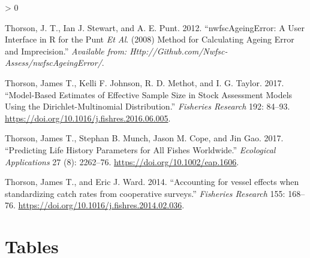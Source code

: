 \documentclass[11pt,
  english,
  a4paper,
]{article}
\newlength{\cslhangindent}
\newenvironment{CSLReferences}[2] %
 {%
  \setlength{\parindent}{0pt}
  \ifodd #1 \everypar{\setlength{\hangindent}{\cslhangindent}}\ignorespaces\fi
  \ifnum #2 > 0
  \setlength{\parskip}{#2\baselineskip}
  \fi
 }%
 {}
\begin{document}
\begin{CSLReferences}{1}{0}
\leavevmode\hypertarget{ref-thorson_nwfscageingerror:_2012}{}%
Thorson, J. T., Ian J. Stewart, and A. E. Punt. 2012. {``{nwfscAgeingError}: A User Interface in {R} for the {P}unt \emph{Et Al}. (2008) Method for Calculating Ageing Error and Imprecision.''} \emph{Available from: Http://Github.com/Nwfsc-Assess/nwfscAgeingError/}.

\leavevmode\hypertarget{ref-thorson_model-based_2017}{}%
Thorson, James T., Kelli F. Johnson, R. D. Methot, and I. G. Taylor. 2017. {``Model-Based Estimates of Effective Sample Size in Stock Assessment Models Using the {Dirichlet}-Multinomial Distribution.''} \emph{Fisheries Research} 192: 84--93. \url{https://doi.org/10.1016/j.fishres.2016.06.005}.

\leavevmode\hypertarget{ref-thorson_predicting_2017}{}%
Thorson, James T., Stephan B. Munch, Jason M. Cope, and Jin Gao. 2017. {``Predicting Life History Parameters for All Fishes Worldwide.''} \emph{Ecological Applications} 27 (8): 2262--76. \url{https://doi.org/10.1002/eap.1606}.

\leavevmode\hypertarget{ref-Thorson2014}{}%
Thorson, James T., and Eric J. Ward. 2014. {``{Accounting for vessel effects when standardizing catch rates from cooperative surveys}.''} \emph{Fisheries Research} 155: 168--76. \url{https://doi.org/10.1016/j.fishres.2014.02.036}.

\end{CSLReferences}

\leavevmode\tagmcend\tagstructend

\clearpage


\hypertarget{tables}{%
\section{Tables}\label{tables}}

\leavevmode\tagmcend\tagstructend



\newpage



\newpage



\newpage



\newpage


\end{document}
